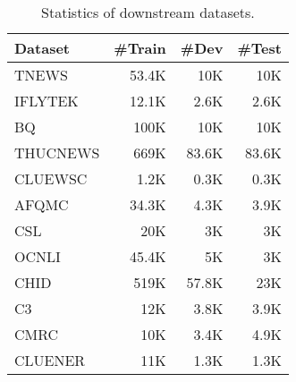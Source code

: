 \begin{table}[t]
    \centering
    \small {
    \begin{tabular}{ lrrr }
        \toprule Dataset & \#Train & \#Dev & \#Test \\
        \midrule
            TNEWS  &  53.4K  & 10K   & 10K   \\
            IFLYTEK  & 12.1K  & 2.6K  & 2.6K   \\
            BQ  &  100K  & 10K   & 10K   \\
            THUCNEWS  & 669K   & 83.6K & 83.6K  \\
            CLUEWSC  &  1.2K  & 0.3K  & 0.3K  \\
            AFQMC    & 34.3K & 4.3K & 3.9K    \\
            CSL &  20K  & 3K   & 3K  \\
            OCNLI   & 45.4K  & 5K   & 3K    \\
            CHID    & 519K  & 57.8K & 23K    \\
            C3      & 12K   & 3.8K  & 3.9K   \\
            CMRC  & 10K   & 3.4K  & 4.9K   \\
            CLUENER  &  11K  & 1.3K  & 1.3K  \\
        \bottomrule
    \end{tabular}}
    \caption{Statistics of downstream datasets.} 
    \label{tab:hyper_parameters}
\end{table}